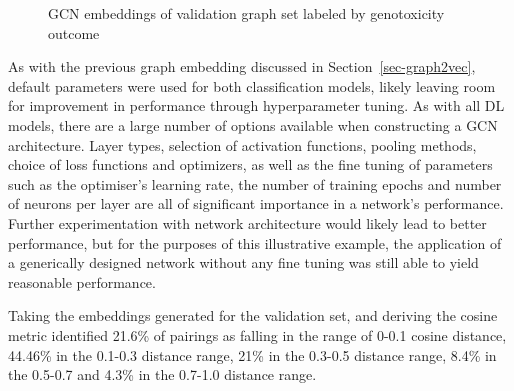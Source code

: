 \documentclass[
  super,
  preprint,
  3p]{elsarticle}
\begin{document}
\begin{figure}[H]


\caption{\label{fig-gcn-nn}GCN embeddings of validation graph set
labeled by genotoxicity outcome}

\end{figure}%

As with the previous graph embedding discussed in
Section~\ref{sec-graph2vec}, default parameters were used for both
classification models, likely leaving room for improvement in
performance through hyperparameter tuning. As with all DL models, there
are a large number of options available when constructing a GCN
architecture. Layer types, selection of activation functions, pooling
methods, choice of loss functions and optimizers, as well as the fine
tuning of parameters such as the optimiser's learning rate, the number
of training epochs and number of neurons per layer are all of
significant importance in a network's performance. Further
experimentation with network architecture would likely lead to better
performance, but for the purposes of this illustrative example, the
application of a generically designed network without any fine tuning
was still able to yield reasonable performance.

Taking the embeddings generated for the validation set, and deriving the
cosine metric identified 21.6\% of pairings as falling in the range of
0-0.1 cosine distance, 44.46\% in the 0.1-0.3 distance range, 21\% in
the 0.3-0.5 distance range, 8.4\% in the 0.5-0.7 and 4.3\% in the
0.7-1.0 distance range.
\end{document}
